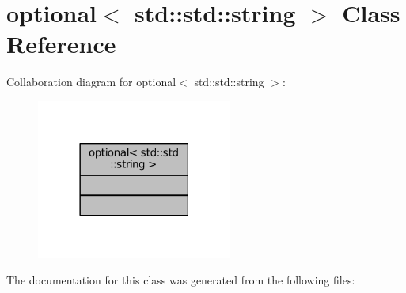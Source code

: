 \hypertarget{classboost_1_1optional_3_01std_1_1std_1_1string_01_4}{}\section{optional$<$ std\+:\+:std\+:\+:string $>$ Class Reference}
\label{classboost_1_1optional_3_01std_1_1std_1_1string_01_4}


Collaboration diagram for optional$<$ std\+:\+:std\+:\+:string $>$\+:
\nopagebreak
\begin{figure}[H]
\begin{center}
\leavevmode
\includegraphics[width=182pt]{classboost_1_1optional_3_01std_1_1std_1_1string_01_4__coll__graph}
\end{center}
\end{figure}


The documentation for this class was generated from the following files\+: